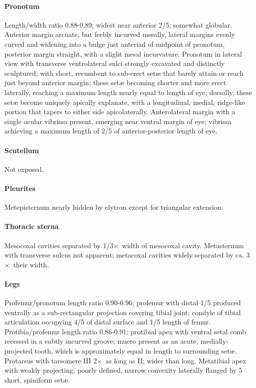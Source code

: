 \documentclass[fleqn,10pt,lineno]{wlpeerj} %
\newcommand{\x}{$\times$~}
\begin{document}
			\paragraph{Pronotum}
				Length/width ratio 0.88-0.89; widest near anterior 2/5; somewhat globular. 
				Anterior margin arcuate, but feebly incurved mesally, lateral margins evenly curved and widening into a bulge just anteriad of midpoint of pronotum, posterior margin straight, with a slight mesal incurvature. 
				Pronotum in lateral view with transverse ventrolateral sulci strongly excavated and distinctly sculptured; with short, recumbent to sub-erect set{\ae} that barely attain or reach just beyond anterior margin; these set{\ae} becoming shorter and more erect laterally, reaching a maximum length nearly equal to length of eye; dorsally, these set{\ae} become uniquely apically explanate, with a longitudinal, medial, ridge-like portion that tapers to either side apicolaterally.
				Anterolateral margin with a single ocular vibrissa present, emerging near ventral margin of eye; vibrissa achieving a maximum length of 2/5 of anterior-posterior length of eye.
			\paragraph{Scutellum}
				Not exposed.
			\paragraph{Pleurites}
				Metepisternum nearly hidden by elytron except for triangular extension.
			\paragraph{Thoracic sterna} 
				Mesocoxal cavities separated by 1/3\x width of mesocoxal cavity. 
				Metasternum with transverse sulcus not apparent; metacoxal cavities widely separated by ca. 3\x their width.
			\paragraph{Legs}
				Profemur/pronotum length ratio 0.90-0.96; profemur with distal 1/5 produced ventrally as a sub-rectangular projection covering tibial joint; condyle of tibial articulation occupying 4/5 of distal surface and 1/5 length of femur. 
				Protibia/profemur length ratio 0.86-0.91; protibial apex with ventral setal comb recessed in a subtly incurved groove; mucro present as an acute, medially-projected tooth, which is approximately equal in length to surrounding set{\ae}. 
				Protarsus with tarsomere III 2\x as long as II; wider than long. 
				Metatibial apex with weakly projecting, poorly defined, narrow convexity laterally flanged by 5 short, spiniform set{\ae}.
\end{document}
